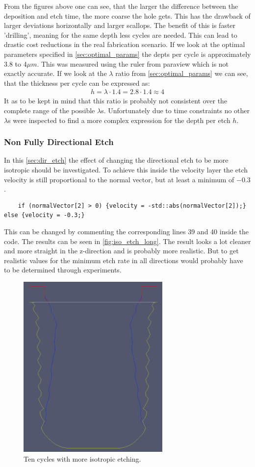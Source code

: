 \documentclass[12pt,a4paper]{article}
\begin{document}
From the figures above one can see, that the larger the difference between the deposition and etch time, the more coarse the hole gets. This has the drawback of larger deviations horizontally and larger scallops. The benefit of this is faster 'drilling', meaning for the same depth less cycles are needed. This can lead to drastic cost reductions in the real fabrication scenario.\newline
If we look at the optimal parameters specified in \autoref{sec:optimal_params} the depts per cycle is approximately 3.8 to 4$\mu m$. This was measured using the ruler from paraview which is not exactly accurate. If we look at the $\lambda$ ratio from \autoref{sec:optimal_params} we can see, that the thickness per cycle can be expressed as:
\begin{align*}
    h = \lambda \cdot 1.4 = 2.8 \cdot 1.4 \approx 4
\end{align*}
It as to be kept in mind that this ratio is probably not consistent over the complete range of the possible $\lambda$s. Unfortunately due to time constraints no other $\lambda$s were inspected to find a more complex expression for the depth per etch $h$.
\subsubsection{Non Fully Directional Etch}\label{sec:dir_etch}
In this \autoref{sec:dir_etch} the effect of changing the directional etch to be more isotropic should be investigated. To achieve this inside the velocity layer the etch velocity is still proportional to the normal vector, but at least a minimum of $-0.3$.
\begin{lstlisting}
    if (normalVector[2] > 0) {velocity = -std::abs(normalVector[2]);} else {velocity = -0.3;}
\end{lstlisting}
This can be changed by commenting the corresponding lines 39 and 40 inside the code. The results can be seen in \autoref{fig:iso_etch_long}. The result looks a lot cleaner and more straight in the z-direction and is probably more realistic. But to get realistic values for the minimum etch rate in all directions would probably have to be determined through experiments.
 \begin{figure}[H]
	\centering \includegraphics[width=7.5cm]{figures/optimal_iso_long.png}
	\caption{Ten cycles with more isotropic etching.} 
    \label{fig:iso_etch_long}
\end{figure}
\end{document}

